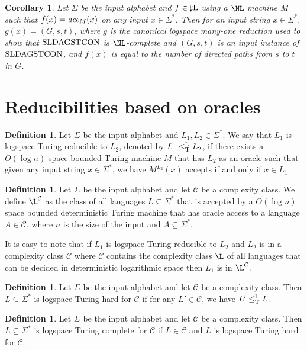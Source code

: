 \documentclass{amsbook}
\newtheorem{corollary}[theorem]{Corollary}
\theoremstyle{definition}
\newtheorem{definition}[theorem]{Definition}
\theoremstyle{remark}
\numberwithin{section}{chapter}
\numberwithin{equation}{chapter}
\newcommand{\LTredn}{\leq^{\small{\rm L}}_{\rm T}}
\newcommand{\sharpL}{\mbox{$\sharp$\rm L}}
\newcommand{\acc}{\mbox{\it acc}}
\newcommand{\LDAGSTCON}{\mbox{\rm SLDAGSTCON}}
\begin{document}
\begin{corollary}\label{parsicomplete}
Let $\Sigma$ be the input alphabet and $f\in \sharpL$ using a $\NL$ machine $M$ such that $f(x)=\acc_M(x)$ on any input $x\in \Sigma^*$. Then for an input string $x\in \Sigma^*$, $g(x)=(G,s,t)$, where $g$ is the canonical logspace many-one reduction used to show that $\LDAGSTCON$ is $\NL$-complete and $(G,s,t)$ is an input instance of $\LDAGSTCON$, and $f(x)$ is equal to the number of directed paths from $s$ to $t$ in $G$.
\end{corollary}
\section{Reducibilities based on oracles}\label{Chap01-Sec-Reduceoracle}
\begin{definition}
Let $\Sigma$ be the input alphabet and $L_1,L_2\in\Sigma^*$. We say that $L_1$ is logspace Turing reducible to $L_2$, denoted by $L_1\LTredn L_2$, if there exists a $O(\log n)$ space bounded Turing machine $M$ that has $L_2$ as an oracle such that given any input string $x\in\Sigma^*$, we have $M^{L_2}(x)$ accepts if and only if $x\in L_1$.
\end{definition}

\begin{definition}
Let $\Sigma $ be the input alphabet and let $\mathcal{C}$ be a complexity class. We define $\L^{\mathcal{C}}$ as the class of all languages $L\subseteq\Sigma^*$ that is accepted by a $O(\log n)$ space bounded deterministic Turing machine that has oracle access to a language $A\in\mathcal{C}$, where $n$ is the size of the input and $A\subseteq\Sigma^*$.
\end{definition}

It is easy to note that if $L_1$ is logspace Turing reducible to $L_2$ and $L_2$ is in a complexity class $\mathcal{C}$ where $\mathcal{C}$ contains the complexity class $\L$ of all languages that can be decided in deterministic logarithmic space then $L_1$ is in $\L^{\mathcal{C}}$.

\begin{definition}
Let $\Sigma$ be the input alphabet and let $\mathcal{C}$ be a complexity class. Then $L\subseteq \Sigma^*$ is logspace Turing hard for $\mathcal{C}$ if for any $L'\in\mathcal{C}$, we have $L'\LTredn L$.
\end{definition}

\begin{definition}
Let $\Sigma$ be the input alphabet and let $\mathcal{C}$ be a complexity class. Then $L\subseteq \Sigma^*$ is logspace Turing complete for $\mathcal{C}$ if $L\in\mathcal{C}$ and $L$ is logspace Turing hard for $\mathcal{C}$.
\end{definition}
\end{document}
